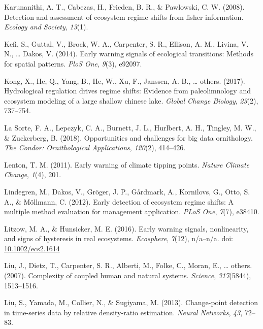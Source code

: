 \documentclass[12pt,twoside,openany]{reedthesis}
\begin{document}
\leavevmode\hypertarget{ref-karunanithi_detection_2008}{}%
Karunanithi, A. T., Cabezas, H., Frieden, B. R., \& Pawlowski, C. W. (2008). Detection and assessment of ecosystem regime shifts from fisher information. \emph{Ecology and Society}, \emph{13}(1).

\leavevmode\hypertarget{ref-kefi2014early}{}%
Kefi, S., Guttal, V., Brock, W. A., Carpenter, S. R., Ellison, A. M., Livina, V. N., \ldots{} Dakos, V. (2014). Early warning signals of ecological transitions: Methods for spatial patterns. \emph{PloS One}, \emph{9}(3), e92097.

\leavevmode\hypertarget{ref-kong2017hydrological}{}%
Kong, X., He, Q., Yang, B., He, W., Xu, F., Janssen, A. B., \ldots{} others. (2017). Hydrological regulation drives regime shifts: Evidence from paleolimnology and ecosystem modeling of a large shallow chinese lake. \emph{Global Change Biology}, \emph{23}(2), 737--754.

\leavevmode\hypertarget{ref-lasorte2018opportunities}{}%
La Sorte, F. A., Lepczyk, C. A., Burnett, J. L., Hurlbert, A. H., Tingley, M. W., \& Zuckerberg, B. (2018). Opportunities and challenges for big data ornithology. \emph{The Condor: Ornithological Applications}, \emph{120}(2), 414--426.

\leavevmode\hypertarget{ref-lenton2011early}{}%
Lenton, T. M. (2011). Early warning of climate tipping points. \emph{Nature Climate Change}, \emph{1}(4), 201.

\leavevmode\hypertarget{ref-lindegren_early_2012}{}%
Lindegren, M., Dakos, V., Gröger, J. P., Gårdmark, A., Kornilovs, G., Otto, S. A., \& Möllmann, C. (2012). Early detection of ecosystem regime shifts: A multiple method evaluation for management application. \emph{PLoS One}, \emph{7}(7), e38410.

\leavevmode\hypertarget{ref-litzow_early_2016}{}%
Litzow, M. A., \& Hunsicker, M. E. (2016). Early warning signals, nonlinearity, and signs of hysteresis in real ecosystems. \emph{Ecosphere}, \emph{7}(12), n/a--n/a. doi: \href{https://doi.org/10.1002/ecs2.1614}{10.1002/ecs2.1614}

\leavevmode\hypertarget{ref-liu_complexity_2007}{}%
Liu, J., Dietz, T., Carpenter, S. R., Alberti, M., Folke, C., Moran, E., \ldots{} others. (2007). Complexity of coupled human and natural systems. \emph{Science}, \emph{317}(5844), 1513--1516.

\leavevmode\hypertarget{ref-liu2013change}{}%
Liu, S., Yamada, M., Collier, N., \& Sugiyama, M. (2013). Change-point detection in time-series data by relative density-ratio estimation. \emph{Neural Networks}, \emph{43}, 72--83.
\end{document}
